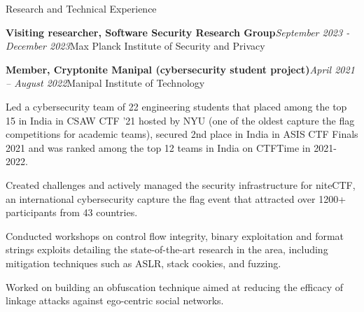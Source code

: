 \documentclass{resume} %
\begin{document}
\begin{rSection}{Research and Technical Experience}
\begin{rSubsection}{\bf Visiting researcher, Software Security Research Group}{\em September 2023 - December 2023}{Max Planck Institute of Security and Privacy}{}
\end{rSubsection}
\begin{rSubsection}{\bf Member, Cryptonite Manipal (cybersecurity student project)}{\em April 2021 -- August 2022}{Manipal Institute of Technology}{}
\item Led a cybersecurity team of 22 engineering students that placed among the top 15 in India in CSAW CTF '21 hosted by NYU (one of the oldest capture the flag competitions for academic teams), secured 2nd place in India in ASIS CTF Finals 2021 and was ranked among the top 12 teams in India on CTFTime in 2021-2022.
\item Created challenges and actively managed the security infrastructure for niteCTF, an international cybersecurity capture the flag event that attracted over 1200+ participants from 43 countries.
\item Conducted workshops on control flow integrity, binary exploitation and format strings exploits detailing the state-of-the-art research in the area, including mitigation techniques such as ASLR, stack cookies, and fuzzing.
\item Worked on building an obfuscation technique aimed at reducing the efficacy of linkage attacks against ego-centric social networks.
\end{rSubsection}
\end{rSection}
\end{document}
